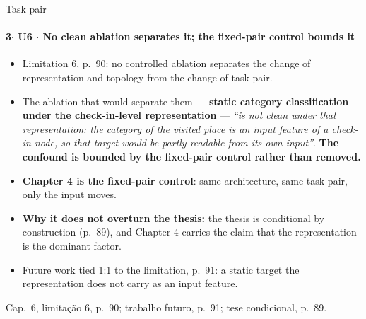 \documentclass{beamer}
\begin{document}
\begin{frame}[noframenumbering]{Task pair}
    \framesubtitle{\normalsize 3$\cdot$ \textbf{U6} $\cdot$ No clean ablation separates it; the fixed-pair control bounds it}
    \hypertarget{u6}{}
    \small\begin{itemize}\setlength{\itemsep}{0pt}\setlength{\parskip}{0pt}
        \item Limitation 6, p.~90: no controlled ablation separates the change of representation and topology from the change of task pair.
        \item The ablation that would separate them --- \textbf{static category classification under the check-in-level representation} --- \textit{``is not clean under that representation: the category of the visited place is an input feature of a check-in node, so that target would be partly readable from its own input''}. \textbf{The confound is bounded by the fixed-pair control rather than removed.}
        \item \textbf{Chapter 4 is the fixed-pair control}: same architecture, same task pair, only the input moves.
        \item \textbf{Why it does not overturn the thesis:} the thesis is conditional by construction (p.~89), and Chapter 4 carries the claim that the representation is the dominant factor.
        \item Future work tied 1:1 to the limitation, p.~91: a static target the representation does not carry as an input feature.
    \end{itemize}
    \vfill
    {\scriptsize
    \begin{minipage}[b]{0.775\linewidth}\raggedright\textcolor{black!70}{Cap.~6, limitação 6, p.~90; trabalho futuro, p.~91; tese condicional, p.~89.}\end{minipage}\hfill
    \begin{minipage}[b]{0.20\linewidth}\raggedleft \hyperlink{b0}{}\end{minipage}}
\end{frame}
\end{document}
